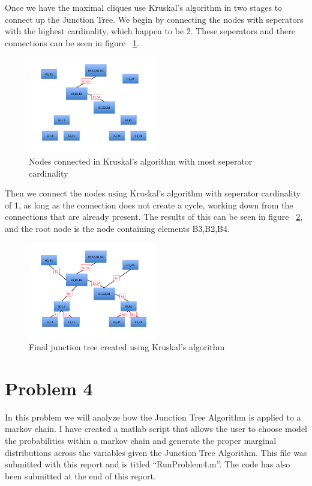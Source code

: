 \documentclass[paper=a4, fontsize=11pt]{scrartcl} %
\begin{document}
Once we have the maximal cliques use Kruskal's algorithm in two stages to connect up the Junction Tree.  
We begin by connecting the nodes with seperators with the highest cardinality, which happen to be 2.
These seperators and there connections can be seen in figure ~\ref{fig:ver1}.

\begin{figure}
\centering
\includegraphics[width=0.5\textwidth]{Problem3/Slide4.png}
\caption{Nodes connected in Kruskal's algorithm with most seperator cardinality}
\label{fig:ver1}
\end{figure}

Then we connect the nodes using Kruskal's algorithm with seperator cardinality of 1, as long as the connection does not create a cycle, working down from the connections that are already present. 
The results of this can be seen in figure ~\ref{fig:ver2}, and the root node is the node containing elements B3,B2,B4.

\begin{figure}
\centering
\includegraphics[width=0.5\textwidth]{Problem3/Slide5.png}
\caption{Final junction tree created using Kruskal's algorithm}
\label{fig:ver2}
\end{figure}


\section{Problem 4}
In this problem we will analyze how the Junction Tree Algorithm is applied to a markov chain.
I have created a matlab script that allows the user to choose model the probabilities within a markov chain and generate the proper marginal distributions across the variables given the Junction Tree Algorithm.
This file was submitted with this report and is titled ``RunProblem4.m''.
The code has also been submitted at the end of this report.
\end{document}
